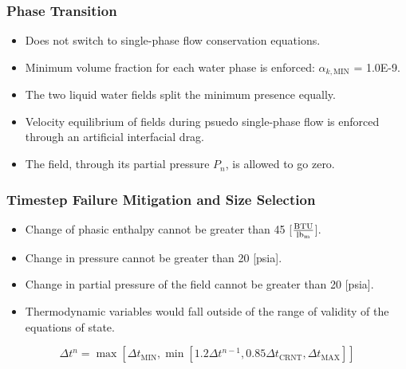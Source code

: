 \documentclass[compress,xcolor=table]{beamer}
\begin{document}
\begin{frame}
\frametitle{Phase Transition}

\begin{itemize}
\item{Does not switch to single-phase flow conservation equations.}
\item{Minimum volume fraction for each water phase is enforced: $\alpha_{k,\text{MIN}}$ = 1.0E-9.}
\item{The two liquid water fields split the minimum presence equally.}
\item{Velocity equilibrium of fields during psuedo single-phase flow is enforced through an artificial interfacial drag.}
\item{The \ncg{} field, through its partial pressure $P_n$, is allowed to go zero.}
\end{itemize}

\end{frame}
\begin{frame}
\frametitle{Timestep Failure Mitigation and Size Selection}

\begin{itemize}
\item{Change of phasic enthalpy cannot be greater than 45 [$\frac{\text{BTU}}{\lbm{}}$].}
\item{Change in pressure cannot be greater than 20 [psia].}
\item{Change in partial pressure of the \ncg{} field cannot be greater than 20 [psia].}
\item{Thermodynamic variables would fall outside of the range of validity of the equations of state.}
\end{itemize}

\begin{equation*}
\label{eqn:time_step}
\Delta t^{n} = \max\left[ \Delta t_{\text{MIN}}, \min\left[1.2 \Delta t^{n-1}, 0.85 \Delta t_{\text{CRNT}}, \Delta t_{\text{MAX}} \right]\right]
\end{equation*}

\end{frame}
\end{document}

